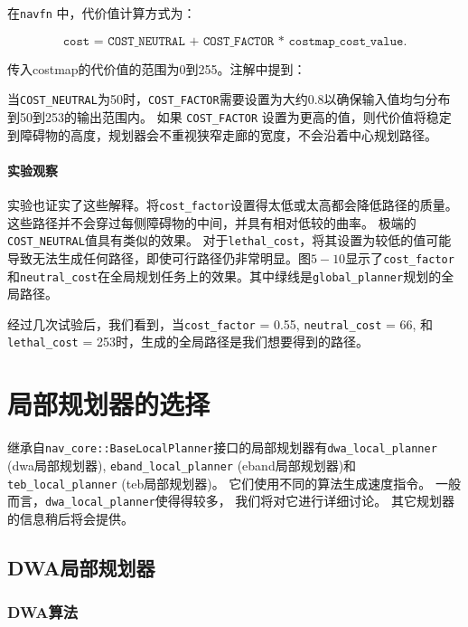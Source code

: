 在\texttt{navfn} 中，代价值计算方式为：

$$\texttt{cost = COST\_NEUTRAL + COST\_FACTOR * costmap\_cost\_value.}$$

\noindent 传入costmap的代价值的范围为0到255。注解中提到：
\begin{displayquote} 
	\kaishu
	当\texttt{COST_NEUTRAL}为50时，\texttt{COST_FACTOR}需要设置为大约0.8以确保输入值均匀分布到50到253的输出范围内。
	如果 \texttt{COST_FACTOR} 设置为更高的值，则代价值将稳定到障碍物的高度，规划器会不重视狭窄走廊的宽度，不会沿着中心规划路径。
\end{displayquote}

\paragraph[Experiment observations]{实验观察} %
实验也证实了这些解释。将\texttt{cost_factor}设置得太低或太高都会降低路径的质量。这些路径并不会穿过每侧障碍物的中间，并具有相对低较的曲率。
极端的\texttt{COST_NEUTRAL}值具有类似的效果。
对于\texttt{lethal_cost}，将其设置为较低的值可能导致无法生成任何路径，即使可行路径仍非常明显。图$5-10$显示了\texttt{cost_factor} 和\texttt{neutral_cost}在全局规划任务上的效果。其中绿线是\texttt{global_planner}规划的全局路径。

经过几次试验后，我们看到，当\texttt{cost_factor} = 0.55, \texttt{neutral_cost} = 66, 和 \texttt{lethal_cost} = 253时，生成的全局路径是我们想要得到的路径。

\section[Local Planner Selection]{局部规划器的选择}

继承自\texttt{nav_core::BaseLocalPlanner}接口的局部规划器有\texttt{dwa_local_planner} (dwa局部规划器), \texttt{eband_local_planner} (eband局部规划器)和 \texttt{teb_local_planner} (teb局部规划器)。
它们使用不同的算法生成速度指令。
一般而言，\texttt{dwa_local_planner}使得得较多，
我们将对它进行详细讨论。
其它规划器的信息稍后将会提供。

\subsection[DWA Local Planner]{DWA局部规划器}
\subsubsection[DWA algorithm]{DWA算法}

